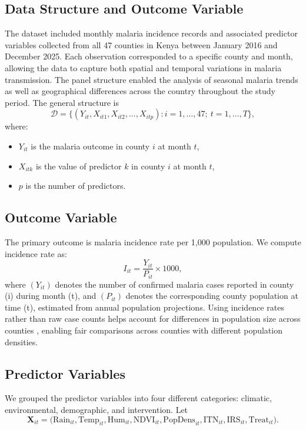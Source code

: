 	\subsection{Data Structure and Outcome Variable}
	The dataset included monthly malaria incidence records and associated predictor variables collected from all 47 counties in Kenya between January 2016 and December 2025. Each observation  corresponded to a specific county and month, allowing the data to capture both spatial and temporal variations in malaria transmission. The panel structure enabled the analysis of seasonal malaria trends as well as geographical differences across the country throughout the study period. The general structure is
	\[
	\mathcal{D} = \{(Y_{it}, X_{it1}, X_{it2}, \dots, X_{itp}) : i = 1, \dots, 47; \ t = 1, \dots, T\},
	\]
	where:
	\begin{itemize} 
		\item \( Y_{it} \) is the malaria outcome in county \( i \) at month \( t \),
		\item \( X_{itk} \) is the value of predictor \( k \) in county \( i \) at month \( t \),
		\item \( p \) is the number of predictors.
	\end{itemize}
	
	\subsection{Outcome Variable}
	The primary outcome is malaria incidence rate per 1,000 population. We compute incidence rate as:
	\[
	I_{it} = \frac{Y_{it}}{P_{it}} \times 1000,
	\]
	where $(Y_{it})$ denotes the number of confirmed malaria cases reported in county (i) during month (t), and $(P_{it})$ denotes the corresponding county population at time (t), estimated from annual population projections. Using incidence rates rather than raw case counts helps account for differences in population size across counties \cite{WHO_malaria_2024}, enabling fair comparisons across counties with different population densities.
	
	\subsection{Predictor Variables}
	\label{sec:predictor_variables}
	 We grouped the predictor variables into four different categories: climatic, environmental, demographic, and intervention. Let
	\[
	\mathbf{X}_{it} = \bigl( \text{Rain}_{it}, \text{Temp}_{it}, \text{Hum}_{it}, \text{NDVI}_{it}, \text{PopDens}_{it}, \text{ITN}_{it}, \text{IRS}_{it}, \text{Treat}_{it} \bigr).
	\]
	
